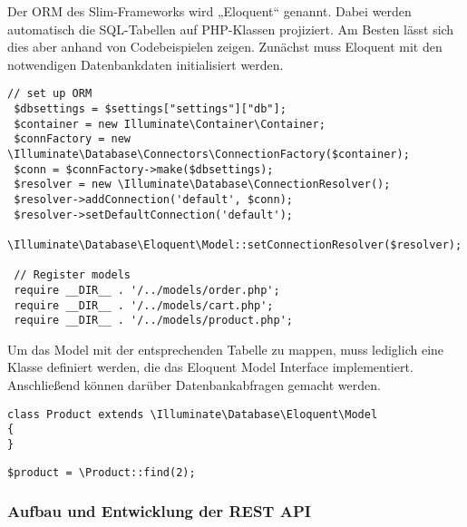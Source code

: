 Der \ac{ORM} des Slim-Frameworks wird „Eloquent“ genannt. Dabei werden automatisch die SQL-Tabellen auf PHP-Klassen projiziert. Am Besten lässt sich dies aber anhand von Codebeispielen zeigen.
Zunächst muss Eloquent mit den notwendigen Datenbankdaten initialisiert werden.
\lstset{language=PHP}  
\begin{lstlisting}[frame=single, breaklines=true] 
// set up ORM
 $dbsettings = $settings["settings"]["db"];
 $container = new Illuminate\Container\Container;
 $connFactory = new \Illuminate\Database\Connectors\ConnectionFactory($container);
 $conn = $connFactory->make($dbsettings);
 $resolver = new \Illuminate\Database\ConnectionResolver();
 $resolver->addConnection('default', $conn);
 $resolver->setDefaultConnection('default');
 \Illuminate\Database\Eloquent\Model::setConnectionResolver($resolver);
 
 // Register models
 require __DIR__ . '/../models/order.php';
 require __DIR__ . '/../models/cart.php';
 require __DIR__ . '/../models/product.php';
\end{lstlisting}

Um das Model mit der entsprechenden Tabelle zu mappen, muss lediglich eine Klasse definiert werden, die das Eloquent Model Interface implementiert. Anschließend können darüber Datenbankabfragen gemacht werden.
\begin{lstlisting}[frame=single] 
class Product extends \Illuminate\Database\Eloquent\Model
{
}
\end{lstlisting}
\begin{lstlisting}[frame=single] 
 $product = \Product::find(2);
\end{lstlisting}

\subsubsection{Aufbau und Entwicklung der REST API}  
\label{sec:Aufbau und Entwicklung der REST API-1}
